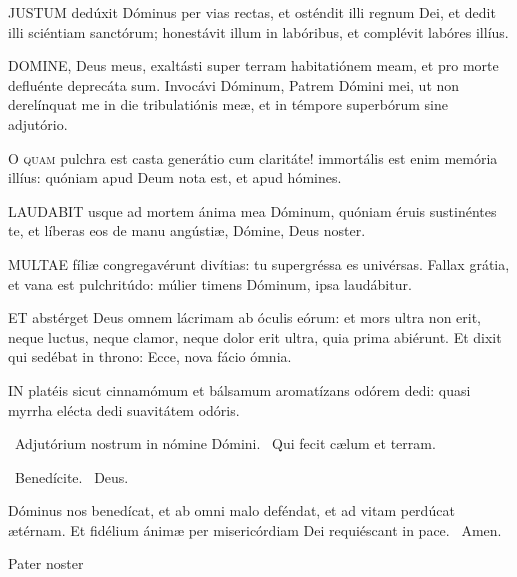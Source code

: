 
\lettrine[lines=2]{J}{USTUM} dedúxit Dóminus per vias rectas, et osténdit illi regnum Dei, et dedit illi sciéntiam sanctórum; honestávit illum in labóribus, et complévit labóres illíus.


\lettrine[lines=2]{D}{OMINE}, Deus meus, exaltásti super terram habitatiónem meam, et pro morte defluénte deprecáta sum. Invocávi Dóminum, Patrem Dómini mei, ut non derelínquat me in die tribulatiónis meæ, et in témpore superbórum sine adjutório.


\lettrine[lines=2]{O}{} \textsc{quam} pulchra est casta generátio cum claritáte! immortális est enim memória illíus: quóniam apud Deum nota est, et apud hómines.


\lettrine[lines=2]{L}{AUDABIT} usque ad mortem ánima mea Dóminum, quóniam éruis sustinéntes te, et líberas eos de manu angústiæ, Dómine, Deus noster.


\lettrine[lines=2]{M}{ULTAE} fíliæ congregavérunt divítias: tu supergréssa es univérsas. Fallax grátia, et vana est pulchritúdo: múlier timens Dóminum, ipsa laudábitur.


\lettrine[lines=2]{E}{T} abstérget Deus omnem lácrimam ab óculis eórum: et mors ultra non erit, neque luctus, neque clamor, neque dolor erit ultra, quia prima abiérunt. Et dixit qui sedébat in throno: Ecce, nova fácio ómnia.


\lettrine[lines=2]{I}{N} platéis sicut cinnamómum et bálsamum aromatízans odórem dedi: quasi myrrha elécta dedi suavitátem odóris.

\V\ Adjutórium nostrum in nómine Dómini. \R\ Qui fecit cælum et terram.

\V\ Benedícite. \R\ Deus.

 Dóminus nos benedícat, et ab omni malo deféndat, et ad vitam perdúcat ætérnam. Et fidélium ánimæ per misericórdiam Dei requiéscant in pace. \R\ Amen.

 Pater noster 

